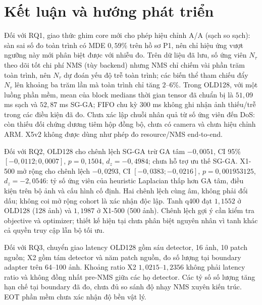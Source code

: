 \documentclass[a4paper,fleqn]{cas-dc}
\begin{document}
\section{Kết luận và hướng phát triển}

Đối với RQ1, giao thức ghim core mới cho phép hiệu chỉnh A/A (sạch so sạch): sàn sai số đo toàn trình có MDE $0{,}59\%$ trên hồ sơ P1, nên chỉ hiệu ứng vượt ngưỡng này mới phân biệt được với nhiễu đo. Trên dữ liệu đã lưu, số ứng viên $N_\tau$ theo dõi tốt chi phí NMS (tùy backend) nhưng NMS chỉ chiếm vài phần trăm toàn trình, nên $N_\tau$ dự đoán yếu độ trễ toàn trình; các biến thể tham chiếu đẩy $N_\tau$ lên khoảng ba trăm lần mà toàn trình chỉ tăng $2$--$6\%$. Trong OLD128, với một luồng phần mềm, mean của block medians thời gian tensor đã chuẩn bị là $51{,}09$ ms sạch và $52{,}87$ ms SG-GA; FIFO chu kỳ 300 ms không ghi nhận ảnh thiếu/trễ trong các điều kiện đã đo. Chưa xác lập chuỗi nhân quả từ số ứng viên đến DoS: còn thiếu đối chứng dương tiêm hộp đồng bộ, chưa có camera và chưa hiệu chỉnh ARM. X5v2 không được dùng như phép đo resource/NMS end-to-end.

Đối với RQ2, OLD128 cho chênh lệch SG-GA trừ GA tâm $-0{,}0051$, CI 95\% $[-0{,}0112;0{,}0007]$, $p=0{,}1504$, $d_z=-0{,}4984$; chưa hỗ trợ ưu thế SG-GA. X1-500 mở rộng cho chênh lệch $-0{,}0293$, CI $[-0{,}0383;-0{,}0216]$, $p=0{,}001953125$, $d_z=-2{,}0546$: tỷ số ứng viên của heuristic Laplacian thấp hơn GA tâm, điều kiện trên bộ ảnh và cấu hình cố định. Hai chênh lệch cùng âm, không phải đổi dấu; không coi mở rộng cohort là xác nhận độc lập. Tanh q400 đạt $1{,}1552$ ở OLD128 (128 ảnh) và $1{,}1987$ ở X1-500 (500 ảnh). Chênh lệch gợi ý cần kiểm tra objective và optimizer; thiết kế hiện tại chưa phân biệt nguyên nhân vì tanh khác cả quyền truy cập lẫn bộ tối ưu.

Đối với RQ3, chuyển giao latency OLD128 gồm sáu detector, 16 ảnh, 10 patch nguồn; X2 gồm tám detector và năm patch nguồn, đo số lượng tại boundary adapter trên 64--100 ảnh. Khoảng ratio X2 $1{,}0215$--$1{,}2356$ không phải latency ratio và không đồng nhất pre-NMS giữa các họ detector. Các tỷ số số lượng tăng hạn chế tại boundary đã đo, chưa đủ so sánh độ nhạy NMS xuyên kiến trúc. EOT phần mềm chưa xác nhận độ bền vật lý.
\end{document}
